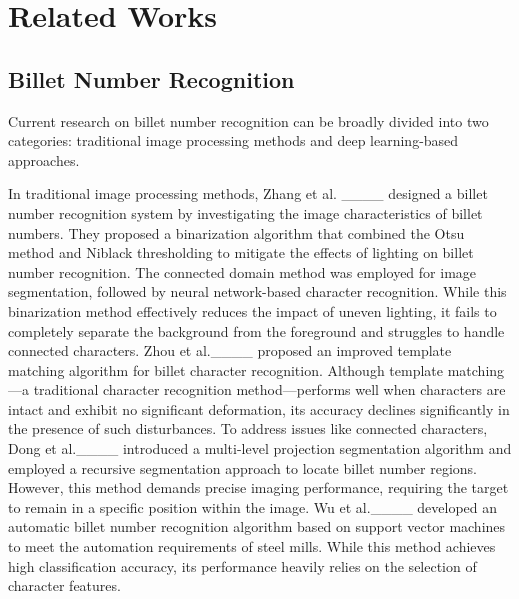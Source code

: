 \section{Related Works}
\label{sec:formatting}
\subsection{Billet Number Recognition }

Current research on billet number recognition can be broadly divided into two categories: traditional image processing methods and deep learning-based approaches.

In traditional image processing methods, Zhang et al. ____ designed a billet number recognition system by investigating the image characteristics of billet numbers. They proposed a binarization algorithm that combined the Otsu method and Niblack thresholding to mitigate the effects of lighting on billet number recognition. The connected domain method was employed for image segmentation, followed by neural network-based character recognition. While this binarization method effectively reduces the impact of uneven lighting, it fails to completely separate the background from the foreground and struggles to handle connected characters. Zhou et al.____ proposed an improved template matching algorithm for billet character recognition. Although template matching—a traditional character recognition method—performs well when characters are intact and exhibit no significant deformation, its accuracy declines significantly in the presence of such disturbances. To address issues like connected characters, Dong et al.____ introduced a multi-level projection segmentation algorithm and employed a recursive segmentation approach to locate billet number regions. However, this method demands precise imaging performance, requiring the target to remain in a specific position within the image. Wu et al.____  developed an automatic billet number recognition algorithm based on support vector machines to meet the automation requirements of steel mills. While this method achieves high classification accuracy, its performance heavily relies on the selection of character features. 

